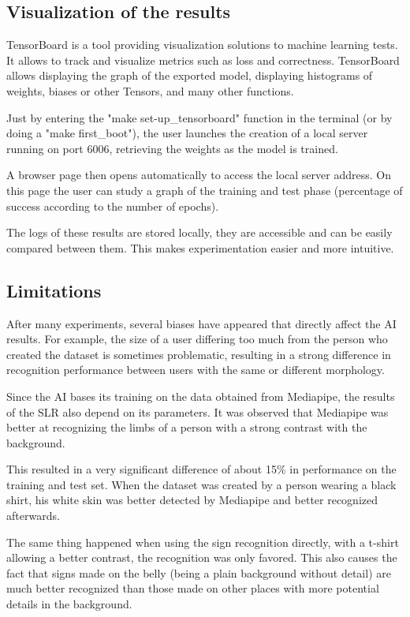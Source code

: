 
\subsection{Visualization of the results}

TensorBoard is a tool providing visualization solutions to machine learning tests. It allows to track and visualize metrics such as loss and correctness. TensorBoard allows displaying the graph of the exported model, displaying histograms of weights, biases or other Tensors, and many other functions.

Just by entering the "make set-up\_tensorboard" function in the terminal (or by doing a "make first\_boot"), the user launches the creation of a local server running on port 6006, retrieving the weights as the model is trained. 

A browser page then opens automatically to access the local server address. On this page the user can study a graph of the training and test phase (percentage of success according to the number of epochs). 

The logs of these results are stored locally, they are accessible and can be easily compared between them. This makes experimentation easier and more intuitive.

\subsection{Limitations}

After many experiments, several biases have appeared that directly affect the AI results. For example, the size of a user differing too much from the person who created the dataset is sometimes problematic, resulting in a strong difference in recognition performance between users with the same or different morphology. 

Since the AI bases its training on the data obtained from Mediapipe, the results of the SLR also depend on its parameters. It was observed that Mediapipe was better at recognizing the limbs of a person with a strong contrast with the background. 

This resulted in a very significant difference of about 15\% in performance on the training and test set. When the dataset was created by a person wearing a black shirt, his white skin was better detected by Mediapipe and better recognized afterwards. 

The same thing happened when using the sign recognition directly, with a t-shirt allowing a better contrast, the recognition was only favored. This also causes the fact that signs made on the belly (being a plain background without detail) are much better recognized than those made on other places with more potential details in the background.

